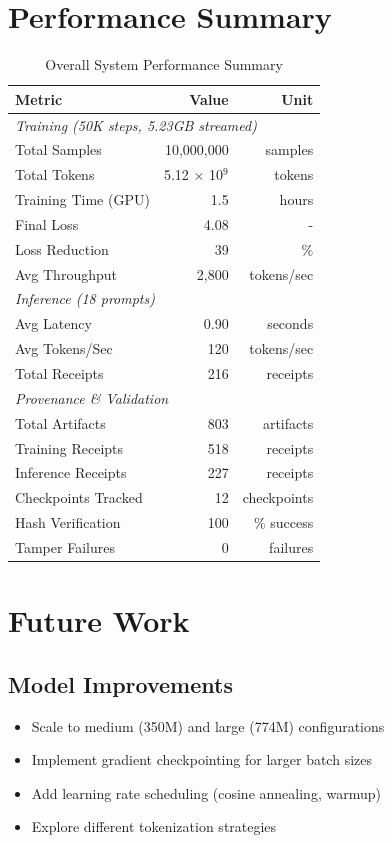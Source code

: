 \documentclass[11pt,a4paper]{article}
\begin{document}
\section{Performance Summary}

\begin{table}[H]
\centering
\begin{tabular}{lrr}
\toprule
\textbf{Metric} & \textbf{Value} & \textbf{Unit} \\
\midrule
\multicolumn{3}{l}{\textit{Training (50K steps, 5.23GB streamed)}} \\
Total Samples & 10,000,000 & samples \\
Total Tokens & 5.12 × 10$^{9}$ & tokens \\
Training Time (GPU) & 1.5 & hours \\
Final Loss & 4.08 & - \\
Loss Reduction & 39 & \% \\
Avg Throughput & 2,800 & tokens/sec \\
\midrule
\multicolumn{3}{l}{\textit{Inference (18 prompts)}} \\
Avg Latency & 0.90 & seconds \\
Avg Tokens/Sec & 120 & tokens/sec \\
Total Receipts & 216 & receipts \\
\midrule
\multicolumn{3}{l}{\textit{Provenance \& Validation}} \\
Total Artifacts & 803 & artifacts \\
Training Receipts & 518 & receipts \\
Inference Receipts & 227 & receipts \\
Checkpoints Tracked & 12 & checkpoints \\
Hash Verification & 100 & \% success \\
Tamper Failures & 0 & failures \\
\bottomrule
\end{tabular}
\caption{Overall System Performance Summary}
\label{tab:summary}
\end{table}

\section{Future Work}

\subsection{Model Improvements}
\begin{itemize}
    \item Scale to medium (350M) and large (774M) configurations
    \item Implement gradient checkpointing for larger batch sizes
    \item Add learning rate scheduling (cosine annealing, warmup)
    \item Explore different tokenization strategies
\end{itemize}
\end{document}
